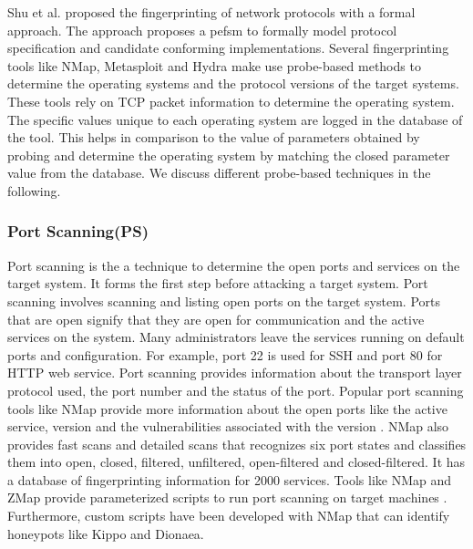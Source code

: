 Shu et al. \cite{shu2006network} proposed the fingerprinting of network protocols with a formal approach. The approach proposes a \acrfull{pefsm} to formally model protocol specification and candidate conforming implementations. Several fingerprinting tools like NMap, Metasploit and Hydra make use probe-based methods to determine the operating systems and the protocol versions of the target systems. These tools rely on TCP packet information to determine the operating system. The specific values unique to each operating system are logged in the database of the tool. This helps in comparison to the value of parameters obtained by probing and determine the operating system by matching the closed parameter value from the database. We discuss different probe-based techniques in the following.

\subsubsection{Port Scanning(PS)}
Port scanning is the a technique to determine the open ports and services on the target system. It forms the first step before attacking a target system. Port scanning involves scanning and listing open ports on the target system. Ports that are open signify that they are open for communication and the active services on the system. Many administrators leave the services running on default ports and configuration. For example, port 22 is used for SSH and port 80 for HTTP web service. Port scanning provides information about the transport layer protocol used, the port number and the status of the port. Popular port scanning tools like NMap provide more information about the open ports like the active service, version and the vulnerabilities associated with the version \cite{NMap}. NMap also provides fast scans and detailed scans that recognizes six port states and classifies them into open, closed, filtered, unfiltered, open-filtered and closed-filtered. It has a database of fingerprinting information for 2000 services. 
Tools like NMap and ZMap provide parameterized scripts to run port scanning on target machines \cite{zmap}. Furthermore, custom scripts have been developed with NMap that can identify honeypots like Kippo and Dionaea.  

